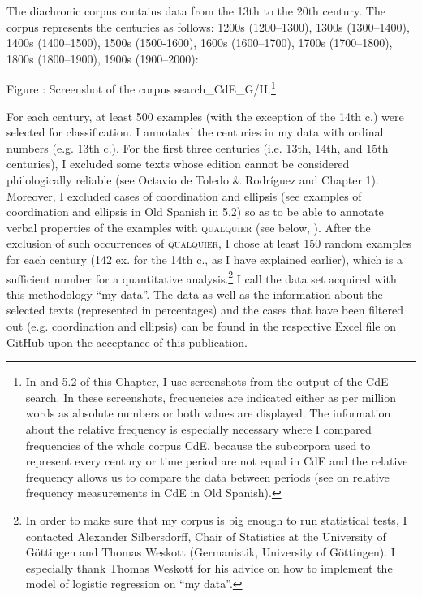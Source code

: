 \documentclass[output=paper]{langscibook}
\begin{document}
  The diachronic corpus contains data from the 13th to the 20th century. The corpus represents the centuries as follows: 1200s (1200–1300), 1300s (1300–1400), 1400s (1400–1500), 1500s (1500-1600), 1600s (1600–1700), 1700s (1700–1800), 1800s (1800–1900), 1900s (1900–2000):

Figure : Screenshot of the corpus search\_CdE\_G/H.\footnote{ \textrm{In  and 5.2 of this Chapter, I use screenshots from the output of the CdE search. In these screenshots, frequencies are indicated either as per million words as absolute numbers or both values are displayed. The information about the relative frequency is especially necessary where I compared frequencies of the whole corpus CdE, because the subcorpora used to represent every century or time period are not equal in CdE and the relative frequency allows us to compare the data between periods (see \citealt{Kellert2018} on relative frequency measurements in CdE in Old Spanish).}}

For each century, at least 500 examples (with the exception of the 14th c.) were selected for classification. I annotated the centuries in my data with ordinal numbers (e.g. 13th c.). For the first three centuries (i.e. 13th, 14th, and 15th centuries), I excluded some texts whose edition cannot be considered philologically reliable (see Octavio de Toledo \& Rodríguez \citealt{Molina2017} and Chapter 1). Moreover, I excluded cases of coordination and ellipsis (see examples of coordination and ellipsis in Old Spanish in 5.2) so as to be able to annotate verbal properties of the examples with \textsc{qualquier} (see below, ). After the exclusion of such occurrences of \textsc{qualquier}, I chose at least 150 random examples for each century (142 ex. for the 14th c., as I have explained earlier), which is a sufficient number for a quantitative analysis.\footnote{\textrm{In order to make sure that my corpus is big enough to run statistical tests, I contacted} \textrm{Alexander Silbersdorff, Chair of Statistics at the University of Göttingen and Thomas Weskott (Germanistik, University of Göttingen). I especially thank Thomas Weskott for his advice on how to implement the model of logistic regression on “my data”.}} I call the data set acquired with this methodology “my data”. The data as well as the information about the selected texts (represented in percentages) and the cases that have been filtered out (e.g. coordination and ellipsis) can be found in the respective Excel file on GitHub upon the acceptance of this publication.
\end{document}
